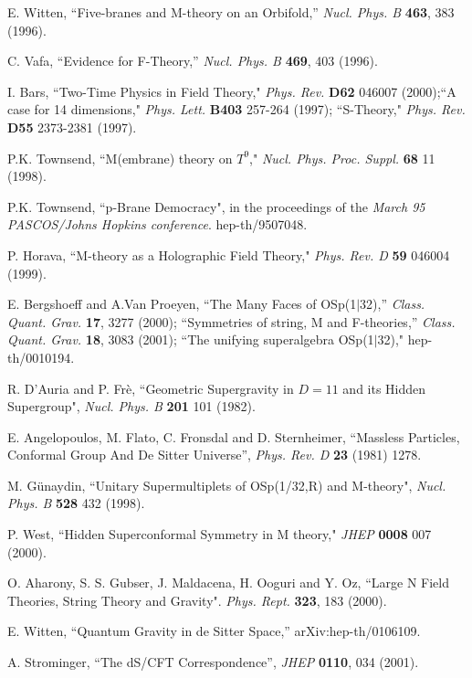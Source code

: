 \documentclass[a4paper,12pt]{article}
\begin{document}
\begin{thebibliography}{99}
E. Witten, ``Five-branes and M-theory on an Orbifold,'' {\it Nucl.
Phys. B} {\bf 463}, 383 (1996).

C. Vafa, ``Evidence for F-Theory,'' {\it Nucl. Phys. B} {\bf 469},
403 (1996).

 I. Bars, ``Two-Time Physics in Field Theory,"
{\it Phys. Rev.} {\bf D62} 046007 (2000);``A case for 14
dimensions," {\it Phys. Lett.} {\bf B403} 257-264 (1997);
``S-Theory," {\it Phys. Rev.} {\bf D55} 2373-2381 (1997).

 P.K. Townsend, ``M(embrane) theory on $T^9$,"
 {\it Nucl. Phys. Proc. Suppl.} {\bf 68} 11 (1998).

  P.K. Townsend, ``p-Brane Democracy",
 in the proceedings of the {\it March 95 PASCOS/Johns
Hopkins conference}. hep-th/9507048.

  P. Horava, ``M-theory as a Holographic Field Theory,"
  {\it Phys. Rev. D} {\bf 59} 046004 (1999).

E. Bergshoeff and A.Van Proeyen, ``The Many Faces of
OSp(1$|$32),'' {\it Class. Quant. Grav.}  {\bf 17}, 3277 (2000);
``Symmetries of string, M and F-theories,'' {\it Class. Quant.
Grav.} {\bf 18}, 3083 (2001); ``The unifying superalgebra
OSp(1$|$32)," hep-th/0010194.

 R. D'Auria and P. Fr\`e,
 ``Geometric Supergravity in $D = 11$ and its Hidden Supergroup",
  {\it Nucl. Phys. B} {\bf 201} 101 (1982).

E. Angelopoulos, M. Flato, C. Fronsdal and D. Sternheimer,
``Massless Particles, Conformal Group And De Sitter Universe'',
{\it Phys. Rev. D} {\bf 23} (1981) 1278.

 M. G\"unaydin, ``Unitary Supermultiplets of OSp(1/32,R) and M-theory",
 {\it Nucl. Phys. B} {\bf 528} 432 (1998).

   P. West, ``Hidden Superconformal Symmetry in M theory,"
 {\it JHEP} {\bf 0008} 007 (2000).


O. Aharony, S. S. Gubser, J. Maldacena, H. Ooguri and Y. Oz,
``Large N Field Theories, String Theory and Gravity". {\it Phys.
Rept.} {\bf 323}, 183 (2000).



E. Witten, ``Quantum Gravity in de Sitter Space,''
arXiv:hep-th/0106109.

A. Strominger, ``The dS/CFT Correspondence'', {\it JHEP} {\bf
0110}, 034 (2001).


\end{thebibliography}
\end{document}
